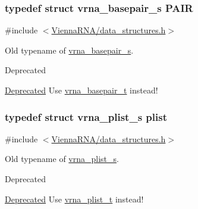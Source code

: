 \subsubsection[{\texorpdfstring{P\+A\+IR}{PAIR}}]{\setlength{\rightskip}{0pt plus 5cm}typedef struct {\bf vrna\+\_\+basepair\+\_\+s} {\bf P\+A\+IR}}\hypertarget{group__data__structures_ga4381025ffbd692e54189b2c679c79c99}{}\label{group__data__structures_ga4381025ffbd692e54189b2c679c79c99}


{\ttfamily \#include $<$\hyperlink{data__structures_8h}{Vienna\+R\+N\+A/data\+\_\+structures.\+h}$>$}



Old typename of \hyperlink{group__data__structures_structvrna__basepair__s}{vrna\+\_\+basepair\+\_\+s}. 

\begin{DoxyRefDesc}{Deprecated}
\item[\hyperlink{deprecated__deprecated000046}{Deprecated}]Use \hyperlink{group__data__structures_gac8c5669d3fb813cacf506489689305ce}{vrna\+\_\+basepair\+\_\+t} instead! \end{DoxyRefDesc}
\subsubsection[{\texorpdfstring{plist}{plist}}]{\setlength{\rightskip}{0pt plus 5cm}typedef struct {\bf vrna\+\_\+plist\+\_\+s} {\bf plist}}\hypertarget{group__data__structures_gab1d8894b43aa84cbc50b862a73785fbc}{}\label{group__data__structures_gab1d8894b43aa84cbc50b862a73785fbc}


{\ttfamily \#include $<$\hyperlink{data__structures_8h}{Vienna\+R\+N\+A/data\+\_\+structures.\+h}$>$}



Old typename of \hyperlink{group__data__structures_structvrna__plist__s}{vrna\+\_\+plist\+\_\+s}. 

\begin{DoxyRefDesc}{Deprecated}
\item[\hyperlink{deprecated__deprecated000047}{Deprecated}]Use \hyperlink{group__data__structures_ga8e4eb5e1bfc95776559575beb359af87}{vrna\+\_\+plist\+\_\+t} instead! \end{DoxyRefDesc}
